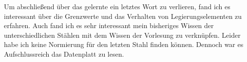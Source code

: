 \documentclass[12pt]{scrreprt}
\begin{document}
Um abschließend über das gelernte ein letztes Wort zu verlieren, fand ich es interessant über die Grenzwerte und das Verhalten von Legierungselementen zu erfahren. Auch fand ich es sehr interessant mein bisheriges Wissen der unterschiedlichen Stählen mit dem Wissen der Vorlesung zu verknüpfen. Leider habe ich keine Normierung für den letzten Stahl finden können. Dennoch war es Aufschlussreich das Datenplatt zu lesen. 
\end{document}
